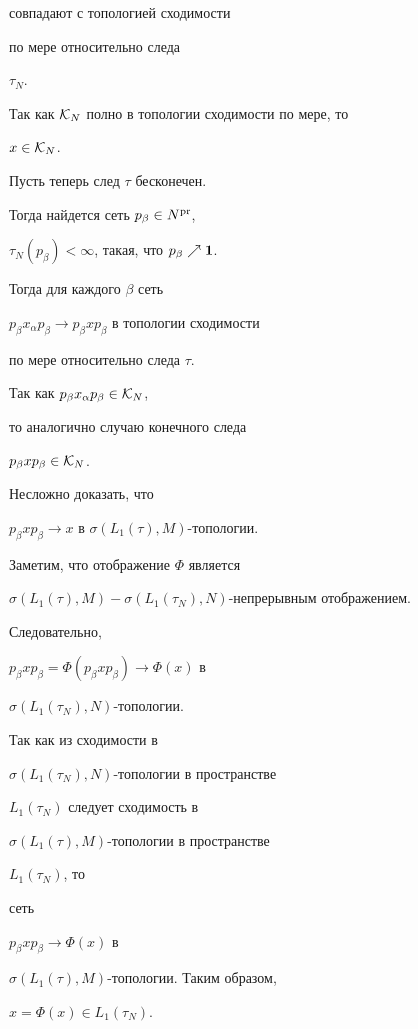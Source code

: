 совпадают с топологией сходимости


по мере относительно следа


$\tau_{N}$.


Так как ${\cal K}_{N}$ полно в топологии сходимости по мере, то


$x\in {\cal K}_{N}$.





Пусть теперь след $\tau$ бесконечен. 


Тогда найдется сеть $p_{\beta}\in N^{\operatorname{pr}}$,


$\tau_N(p_{\beta})<\infty$, такая, что $p_{\beta}\nearrow {\bold 1}$.


Тогда для каждого $\beta$ сеть


$p_{\beta}x_{\alpha}p_{\beta}\to p_{\beta}xp_{\beta} $ в топологии сходимости


по мере относительно следа $\tau$.


Так как $p_{\beta}x_{\alpha}p_{\beta}\in {\cal K}_{N}$, 


то аналогично случаю конечного следа


$p_{\beta}xp_{\beta}\in {\cal K}_{N}$.


Несложно доказать, что


$p_{\beta}xp_{\beta}\to x$ в $\sigma(L_{1}(\tau),M)$-топологии.


Заметим, что отображение $\Phi$ является


$\sigma(L_{1}(\tau),M){-}\sigma(L_{1}(\tau_{N}),N)$-непрерывным отображением.


Следовательно,


$p_{\beta}xp_{\beta}=\Phi(p_{\beta}xp_{\beta})\to \Phi(x)$ в


$\sigma(L_{1}(\tau_{N}),N)$-топологии.


Так как из сходимости в


$\sigma(L_{1}(\tau_{N}),N)$-топологии в пространстве


$L_{1}(\tau_{N})$ следует сходимость в


$\sigma(L_{1}(\tau),M)$-топологии в пространстве


$L_{1}(\tau_{N})$, то


сеть


$p_{\beta}xp_{\beta}\to \Phi(x)$ в


$\sigma(L_{1}(\tau),M)$-топологии. Таким образом,


$x=\Phi(x)\in L_{1}(\tau_{N})$.





